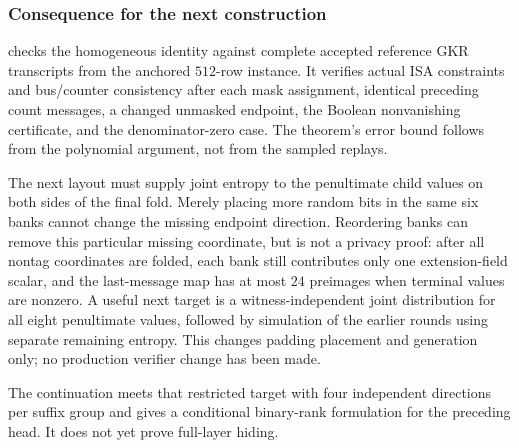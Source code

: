 \subsubsection{Consequence for the next construction}

 checks the homogeneous identity against complete accepted reference GKR transcripts from the anchored $512$-row instance. It verifies actual ISA constraints and bus/counter consistency after each mask assignment, identical preceding count messages, a changed unmasked endpoint, the Boolean nonvanishing certificate, and the denominator-zero case. The theorem's error bound follows from the polynomial argument, not from the sampled replays.

The next layout must supply joint entropy to the penultimate child values on both sides of the final fold. Merely placing more random bits in the same six banks cannot change the missing endpoint direction. Reordering banks can remove this particular missing coordinate, but is not a privacy proof: after all nontag coordinates are folded, each bank still contributes only one extension-field scalar, and the last-message map has at most $24$ preimages when terminal values are nonzero. A useful next target is a witness-independent joint distribution for all eight penultimate values, followed by simulation of the earlier rounds using separate remaining entropy. This changes padding placement and generation only; no production verifier change has been made.

The continuation  meets that restricted target with four independent directions per suffix group and gives a conditional binary-rank formulation for the preceding head. It does not yet prove full-layer hiding.

